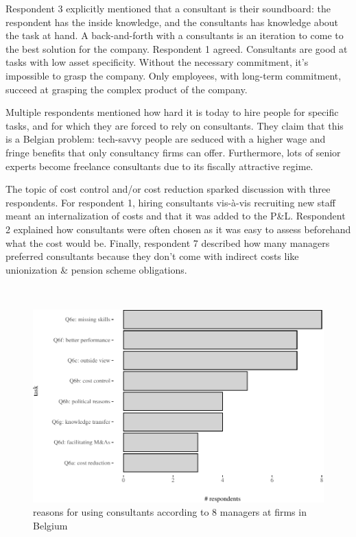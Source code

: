 \documentclass[
  man,floatsintext]{apa6}
\begin{document}
Respondent 3 explicitly mentioned that a consultant is their soundboard: the respondent has the inside knowledge, and the consultants has knowledge about the task at hand. A back-and-forth with a consultants is an iteration to come to the best solution for the company. Respondent 1 agreed. Consultants are good at tasks with low asset specificity. Without the necessary commitment, it's impossible to grasp the company. Only employees, with long-term commitment, succeed at grasping the complex product of the company.

Multiple respondents mentioned how hard it is today to hire people for specific tasks, and for which they are forced to rely on consultants. They claim that this is a Belgian problem: tech-savvy people are seduced with a higher wage and fringe benefits that only consultancy firms can offer. Furthermore, lots of senior experts become freelance consultants due to its fiscally attractive regime.

The topic of cost control and/or cost reduction sparked discussion with three respondents. For respondent 1, hiring consultants vis-à-vis recruiting new staff meant an internalization of costs and that it was added to the P\&L. Respondent 2 explained how consultants were often chosen as it was easy to assess beforehand what the cost would be. Finally, respondent 7 described how many managers preferred consultants because they don't come with indirect costs like unionization \& pension scheme obligations.

\(~\)

\begin{figure}

{\centering \includegraphics[width=0.75\linewidth]{2_ams_five_pager_files/figure-latex/unnamed-chunk-5-1} 

}

\caption{reasons for using consultants according to 8 managers at firms in Belgium}\label{fig:unnamed-chunk-5}
\end{figure}
\end{document}
